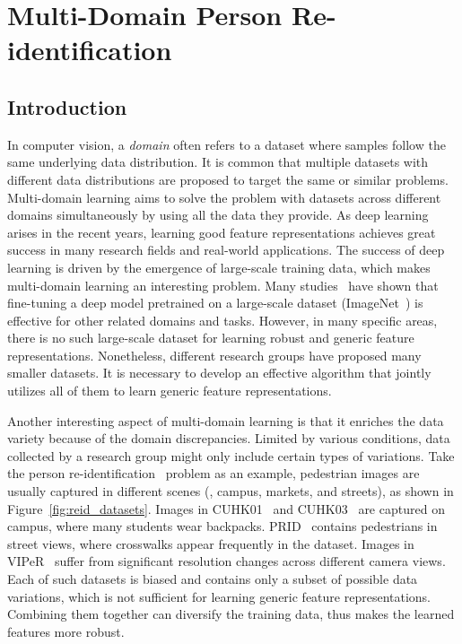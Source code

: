 \chapter{Multi-Domain Person Re-identification}
\label{ch:multi-domain}

\newcommand{\specialcell}[2][c]{\begin{tabular}[#1]{@{}c@{}}#2\end{tabular}}

\section{Introduction} %
\label{sec:introduction}

In computer vision, a \emph{domain} often refers to a dataset where samples follow the same underlying data distribution. It is common that multiple datasets with different data distributions are proposed to target the same or similar problems. Multi-domain learning aims to solve the problem with datasets across different domains simultaneously by using all the data they provide. As deep learning arises in the recent years, learning good feature representations achieves great success in many research fields and real-world applications. The success of deep learning is driven by the emergence of large-scale training data, which makes multi-domain learning an interesting problem. Many studies~\cite{donahue2013decaf,azizpour2014generic,oquab2014learning} have shown that fine-tuning a deep model pretrained on a large-scale dataset (\eg ImageNet~\cite{deng2009imagenet}) is effective for other related domains and tasks. However, in many specific areas, there is no such large-scale dataset for learning robust and generic feature representations. Nonetheless, different research groups have proposed many smaller datasets. It is necessary to develop an effective algorithm that jointly utilizes all of them to learn generic feature representations.

Another interesting aspect of multi-domain learning is that it enriches the data variety because of the domain discrepancies. Limited by various conditions, data collected by a research group might only include certain types of variations. Take the person re-identification~\cite{ajakan2014domain,li2014deepreid} problem as an example, pedestrian images are usually captured in different scenes (\eg, campus, markets, and streets), as shown in Figure~\ref{fig:reid_datasets}. Images in CUHK01~\cite{li2013locally} and CUHK03~\cite{li2014deepreid} are captured on campus, where many students wear backpacks. PRID~\cite{hirzer11a} contains pedestrians in street views, where crosswalks appear frequently in the dataset. Images in VIPeR~\cite{gray2007evaluating} suffer from significant resolution changes across different camera views. Each of such datasets is biased and contains only a subset of possible data variations, which is not sufficient for learning generic feature representations. Combining them together can diversify the training data, thus makes the learned features more robust.

